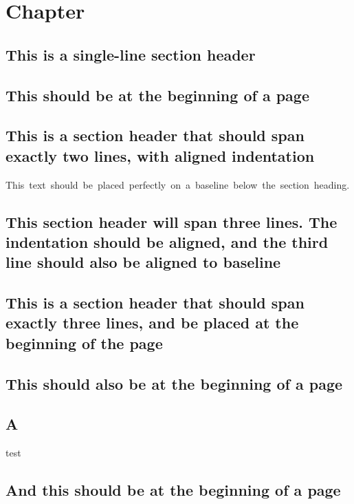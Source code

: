 \documentclass[baselinegrid,parindent,noprint,nocopyright]{uit-thesis-test}
\begin{document}
\mainmatter

\chapter{Chapter}
\lipsum[1]

\section{This is a single-line section header}
\lipsum[3-8]

\section{This should be at the beginning of a page}
\lipsum[9]

\section{This is a section header that should span exactly two lines, with aligned indentation}
\mbox{This~text~should~be~placed~perfectly~on~a~baseline~below~the~section~heading.}

\lipsum[10]

\section{This section header will span three lines. The indentation should be aligned, and the third line should also be aligned to baseline}
\lipsum[11-16]

\section{This is a section header that should span exactly three lines, and be placed at the beginning of the page}

\lipsum[17-20]




\section{This should also be at the beginning of a page}
\section{A}
test

\newpage
\section{And this should be at the beginning of a page}
\end{document}
